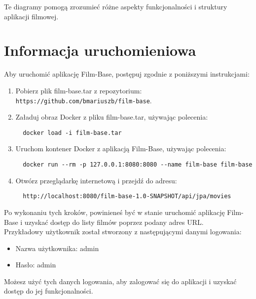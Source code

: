 \documentclass{article}
\begin{document}
%
%
%

Te diagramy pomogą zrozumieć różne aspekty funkcjonalności i struktury aplikacji filmowej.

\section{Informacja uruchomieniowa}
Aby uruchomić aplikację Film-Base, postępuj zgodnie z poniższymi instrukcjami:

\begin{enumerate}
  \item Pobierz plik film-base.tar z repozytorium: \texttt{https://github.com/bmariuszb/film-base}.
  
  \item Załaduj obraz Docker z pliku film-base.tar, używając polecenia:
  \begin{verbatim}
  docker load -i film-base.tar
  \end{verbatim}
  
  \item Uruchom kontener Docker z aplikacją Film-Base, używając polecenia:
  \begin{verbatim}
  docker run --rm -p 127.0.0.1:8080:8080 --name film-base film-base
  \end{verbatim}
  
  \item Otwórz przeglądarkę internetową i przejdź do adresu:
  \begin{verbatim}
  http://localhost:8080/film-base-1.0-SNAPSHOT/api/jpa/movies
  \end{verbatim}
\end{enumerate}

Po wykonaniu tych kroków, powinieneś być w stanie uruchomić aplikację Film-Base i uzyskać dostęp do listy filmów poprzez podany adres URL.\\

Przykładowy użytkownik został stworzony z następującymi danymi logowania:
\begin{itemize}
  \item Nazwa użytkownika: admin
  \item Hasło: admin
\end{itemize}

Możesz użyć tych danych logowania, aby zalogować się do aplikacji i uzyskać dostęp do jej funkcjonalności.
\end{document}
